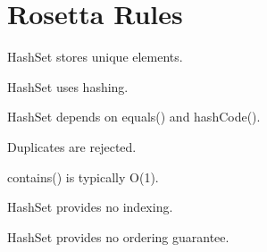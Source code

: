 \documentclass[11pt,a4paper]{book}
\begin{document}

\section{Rosetta Rules}

\begin{rosettarule}

HashSet stores unique elements.

\end{rosettarule}


\begin{rosettarule}

HashSet uses hashing.

\end{rosettarule}


\begin{rosettarule}

HashSet depends on
equals() and hashCode().

\end{rosettarule}


\begin{rosettarule}

Duplicates are rejected.

\end{rosettarule}


\begin{rosettarule}

contains() is typically O(1).

\end{rosettarule}


\begin{rosettarule}

HashSet provides no indexing.

\end{rosettarule}


\begin{rosettarule}

HashSet provides no ordering guarantee.

\end{rosettarule}
\end{document}
